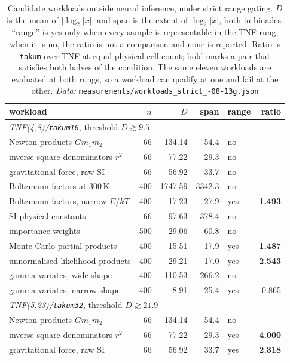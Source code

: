 \begin{table}[htbp]\centering
\caption{Candidate workloads outside neural inference, under strict range gating.
$D$ is the mean of $\lvert \log_2|x| \rvert$ and span is the extent of
$\log_2|x|$, both in binades. ``range'' is yes only when every sample is
representable in the TNF rung; when it is no, the ratio is not a comparison and none is
reported. Ratio is \texttt{takum} over TNF at equal physical cell count; bold
marks a pair that satisfies both halves of the condition. The same eleven
workloads are evaluated at both rungs, so a workload can qualify at one and fail
at the other. \emph{Data:} \texttt{measurements/\allowbreak workloads\_\allowbreak strict\_-08-13g.json}}
\label{tab:workloads}
\begin{tabular}{lrrrlr}
\hline
workload & $n$ & $D$ & span & range & ratio \\
\hline
\multicolumn{6}{l}{\emph{TNF(4,8)/\texttt{takum16}}, threshold $D \gtrsim 9.5$}\\
\hline
Newton products $Gm_1m_2$ & 66 & 134.14 & 54.4 & no & --- \\
inverse-square denominators $r^2$ & 66 & 77.22 & 29.3 & no & --- \\
gravitational force, raw SI & 66 & 56.92 & 33.7 & no & --- \\
Boltzmann factors at $300$\,K & 400 & 1747.59 & 3342.3 & no & --- \\
Boltzmann factors, narrow $E/kT$ & 400 & 17.23 & 27.9 & yes & \textbf{1.493} \\
SI physical constants & 66 & 97.63 & 378.4 & no & --- \\
importance weights & 500 & 29.06 & 60.8 & no & --- \\
Monte-Carlo partial products & 400 & 15.51 & 17.9 & yes & \textbf{1.487} \\
unnormalised likelihood products & 400 & 29.21 & 17.0 & yes & \textbf{2.543} \\
gamma variates, wide shape & 400 & 110.53 & 266.2 & no & --- \\
gamma variates, narrow shape & 400 & 8.91 & 25.4 & yes & 0.865 \\
\hline
\multicolumn{6}{l}{\emph{TNF(5,23)/\texttt{takum32}}, threshold $D \gtrsim 21.9$}\\
\hline
Newton products $Gm_1m_2$ & 66 & 134.14 & 54.4 & no & --- \\
inverse-square denominators $r^2$ & 66 & 77.22 & 29.3 & yes & \textbf{4.000} \\
gravitational force, raw SI & 66 & 56.92 & 33.7 & yes & \textbf{2.318} \\

\end{tabular}
\end{table}
